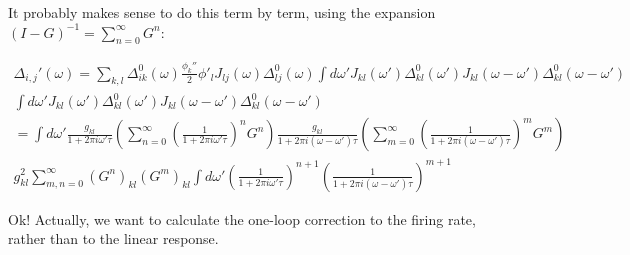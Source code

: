 \documentclass [12pt]{amsart}
\theoremstyle{definition}
\newcommand{\inv}{^{-1}}
\begin{document}
It probably makes sense to do this term by term, using the expansion $(I - G)\inv = \sum_{n=0}^\infty G^n$: 

\begin{align*}
\Delta_{i,j}'(\omega)  = \sum_{k,l}  \Delta_{ik}^0(\omega) \frac{\phi_k''}{2} \phi'_l J_{lj}(\omega ) \Delta_{lj}^0(\omega) \int d\omega'J_{k l}(\omega')\Delta^0_{kl}(\omega') J_{kl}(\omega - \omega') \Delta^0_{kl}(\omega - \omega')\\
 \int d\omega'J_{k l}(\omega')\Delta^0_{kl}(\omega') J_{kl}(\omega - \omega') \Delta^0_{kl}(\omega - \omega') \\=  \int d\omega'\frac{g_{kl}}{1 + 2\pi i \omega'\tau} \left(\sum_{n = 0}^\infty \left(\frac{1}{1 + 2\pi i \omega'\tau}\right)^n G^n\right)\frac{g_{kl}}{1 + 2\pi i (\omega-\omega')\tau} \left(\sum_{m = 0}^\infty \left(\frac{1}{1 + 2\pi i (\omega-\omega')\tau}\right)^m G^m \right)\\
g_{kl}^2 \sum_{m,n = 0}^\infty \left(G^n\right)_{kl}\left(G^m\right)_{kl} \int d\omega' \left(\frac{1}{1 + 2\pi i\omega' \tau}\right)^{n+1} \left(\frac{1}{1 + 2\pi i(\omega-\omega') \tau}\right)^{m+1} 
\end{align*}

Ok! Actually, we want to calculate the one-loop correction to the firing rate, rather than to the linear response. 
\end{document}
